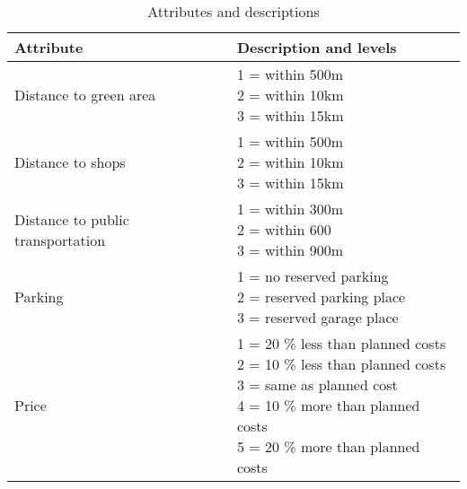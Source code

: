 \begin{table}[H]
\scriptsize
\caption{Attributes and descriptions \label{tab:atts}}
\centering
\begin{tabular}[top]{>{\raggedright\arraybackslash}p{15em}l}
\toprule
Attribute & Description and levels\\
\midrule
Distance to green area & \makecell[l]{1 = within 500m \\ 2 = within 10km \\ 3 = within 15km}\\
\addlinespace
Distance to shops & \makecell[l]{1 = within 500m \\ 2 = within 10km \\ 3 = within 15km}\\
\addlinespace
Distance to public transportation & \makecell[l]{1 = within 300m \\ 2 = within 600 \\ 3 = within 900m}\\
\addlinespace
Parking & \makecell[l]{1 = no reserved parking \\ 2 = reserved parking place \\ 3 = reserved garage place}\\
\addlinespace
Price & \makecell[l]{1 = 20 \% less than planned costs \\ 2 = 10 \% less than planned costs \\ 3 = same as planned cost \\ 4 = 10 \% more than planned costs  \\ 5 = 20 \% more than planned costs}\\
\bottomrule
\end{tabular}
\end{table}
